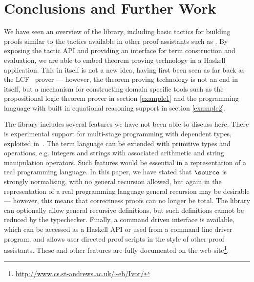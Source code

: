 \section{Conclusions and Further Work}

We have seen an overview of the \Ivor{} library, including basic
tactics for building proofs similar to the tactics available in other
proof assistants such as \Coq{}. By exposing the tactic API and
providing an interface for term construction and evaluation, we are
able to embed theorem proving technology in a Haskell
application. This in itself is not a new idea, having first been seen
as far back as the LCF~\cite{lcf-milner} prover --- however, the
theorem proving technology is not an end in itself, but a
mechanism for constructing domain specific tools such as the
propositional logic theorem prover in section \ref{example1} and the
programming language with built in equational reasoning support in
section \ref{example2}.

The library includes several features we have not been able to discuss
here. There is experimental support for multi-stage programming with
dependent types, exploited in~\cite{dtpmsp-gpce}.  The term language
can be extended with primitive types and operations, e.g. integers and
strings with associated arithmetic and string manipulation
operators. Such features would be essential in a representation of a
real programming language. In this paper, we have stated that
$\source$ is strongly normalising, with no general recursion allowed,
but again in the representation of a real programming language general
recursion may be desirable --- however, this means that correctness
proofs can no longer be total. The library can optionally allow
general recursive definitions, but such definitions cannot be reduced
by the typechecker. Finally, a command driven interface is available,
which can be accessed as a Haskell API or used from a command line
driver program, and allows user directed proof scripts in the style of
other proof assistants. These and other features are fully documented
on the web
site\footnote{\url{http://www.cs.st-andrews.ac.uk/~eb/Ivor/}}.


